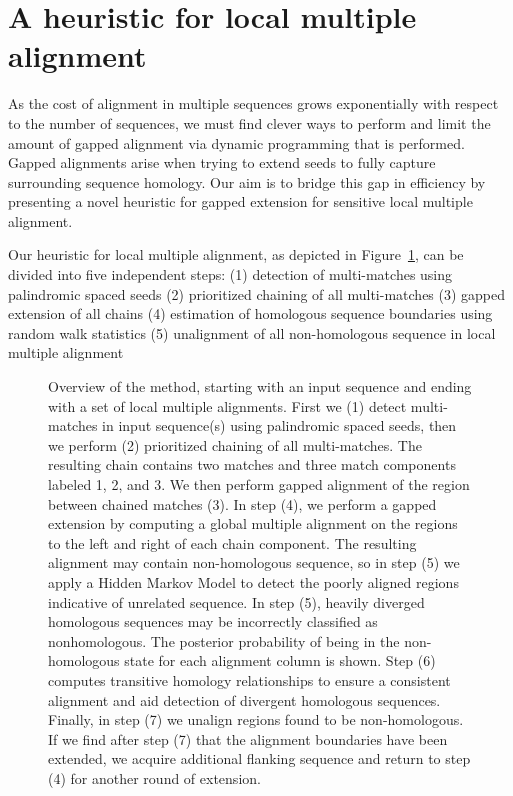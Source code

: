 \documentclass{ws-procs9x6}
\begin{document}
\section{A heuristic for local multiple alignment}
As the cost of alignment in multiple sequences grows exponentially with respect to the number of sequences, we must find clever ways to perform and limit the amount of gapped alignment via dynamic programming that is performed. Gapped alignments arise when trying to extend seeds to fully capture surrounding sequence homology. Our aim is to bridge this gap in efficiency by presenting a novel heuristic for gapped extension for sensitive local multiple alignment.

Our heuristic for local multiple alignment, as depicted in Figure~\ref{fig-main},
can be divided into five independent steps:
(1) detection of multi-matches using palindromic spaced seeds
(2) prioritized chaining of all multi-matches
(3) gapped extension of all chains
(4) estimation of homologous sequence boundaries using random walk statistics
(5) unalignment of all non-homologous sequence in local multiple alignment



\begin{figure}[p]
\begin{center}
\end{center}
\caption{Overview of the method, starting with an input sequence and ending with a set of local multiple alignments. First we (1) detect multi-matches in input sequence(s) using palindromic spaced seeds, then we perform (2) prioritized chaining of all multi-matches.  The resulting chain contains two matches and three match components labeled 1, 2, and 3.  We then perform gapped alignment of the region between chained matches (3).   In step (4), we perform a gapped extension by computing a global multiple alignment on the regions to the left and right of each chain component.  The resulting alignment may contain non-homologous sequence, so in step (5) we apply a Hidden Markov Model to detect the poorly aligned regions indicative of unrelated sequence.  In step (5), heavily diverged homologous sequences may be incorrectly classified as nonhomologous. The posterior probability of being in the non-homologous state for each alignment column is shown.  Step (6) computes transitive homology relationships to ensure a consistent alignment and aid detection of divergent homologous sequences.  Finally, in step (7) we unalign regions found to be non-homologous.  If we find after step (7) that the alignment boundaries have been extended, we acquire additional flanking sequence and return to step (4) for another round of extension.}
\label{fig-main}
\end{figure}
\end{document}
